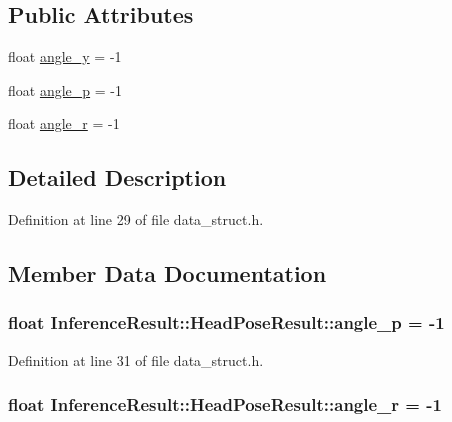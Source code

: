 \subsection*{Public Attributes}
\begin{DoxyCompactItemize}
\item 
float \hyperlink{structInferenceResult_1_1HeadPoseResult_a6f9491752ad71d474f7b52f626bc6989}{angle\+\_\+y} = -\/1
\item 
float \hyperlink{structInferenceResult_1_1HeadPoseResult_aa5451224989c6d65741ff3a90e4c73a7}{angle\+\_\+p} = -\/1
\item 
float \hyperlink{structInferenceResult_1_1HeadPoseResult_a34e1aa51cf21ddc17d874260f174c75e}{angle\+\_\+r} = -\/1
\end{DoxyCompactItemize}


\subsection{Detailed Description}


Definition at line 29 of file data\+\_\+struct.\+h.



\subsection{Member Data Documentation}
\subsubsection[{\texorpdfstring{angle\+\_\+p}{angle_p}}]{\setlength{\rightskip}{0pt plus 5cm}float Inference\+Result\+::\+Head\+Pose\+Result\+::angle\+\_\+p = -\/1}\hypertarget{structInferenceResult_1_1HeadPoseResult_aa5451224989c6d65741ff3a90e4c73a7}{}\label{structInferenceResult_1_1HeadPoseResult_aa5451224989c6d65741ff3a90e4c73a7}


Definition at line 31 of file data\+\_\+struct.\+h.

\subsubsection[{\texorpdfstring{angle\+\_\+r}{angle_r}}]{\setlength{\rightskip}{0pt plus 5cm}float Inference\+Result\+::\+Head\+Pose\+Result\+::angle\+\_\+r = -\/1}\hypertarget{structInferenceResult_1_1HeadPoseResult_a34e1aa51cf21ddc17d874260f174c75e}{}\label{structInferenceResult_1_1HeadPoseResult_a34e1aa51cf21ddc17d874260f174c75e}


